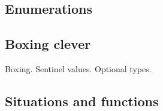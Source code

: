 \documentclass[10pt]{amsart}
\begin{document}
\subsection{Enumerations}

\subsection{Boxing clever}

Boxing.  Sentinel values.  Optional types.

\subsection{Situations and functions}





\addtocounter{section}{1}


\end{document}
